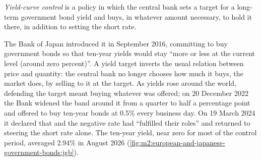 \begin{definition}\label{def:m2:european-and-japanese-government-bonds:ycc}
\emph{Yield-curve control} is a policy in which the
central bank sets a target for a long-term government bond yield and buys, in
whatever amount necessary, to hold it there, in addition to setting the short
rate.
\end{definition}

The Bank of Japan introduced it in September 2016, committing to buy
government bonds so that ten-year yields would stay ``more or less at the
current level (around zero percent)''. A yield target inverts the usual
relation between price and quantity: the central bank no longer chooses how
much it buys, the market does, by selling to it at the target. As yields rose
around the world, defending the target meant buying whatever was offered; on
20 December 2022 the Bank widened the band around it from a quarter to half a
percentage point and offered to buy ten-year bonds at 0.5\% every business day.
On 19 March 2024 it declared that  and the
negative rate had ``fulfilled their roles'' and returned to steering the short
rate alone. The ten-year yield, near zero for most of the control period,
averaged 2.94\% in August 2026 (\cref{fig:m2:european-and-japanese-government-bonds:jgb}).

\begin{omfigure}

\label{fig:m2:european-and-japanese-government-bonds:jgb}
\end{omfigure}

